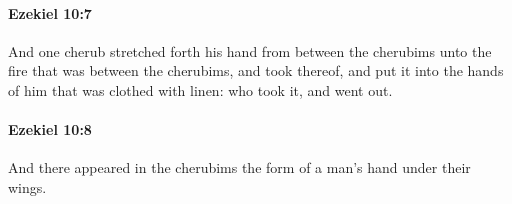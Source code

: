 		\paragraph{Ezekiel 10:7} %
			\label{EZEKIEL-10-7}

			And one cherub stretched forth his hand from between the cherubims unto the fire that was between the cherubims, and took thereof, and put it into the hands of him that was clothed with linen: who took it, and went out.


		\paragraph{Ezekiel 10:8} %
			\label{EZEKIEL-10-8}

			And there appeared in the cherubims the form of a man’s hand under their wings.


